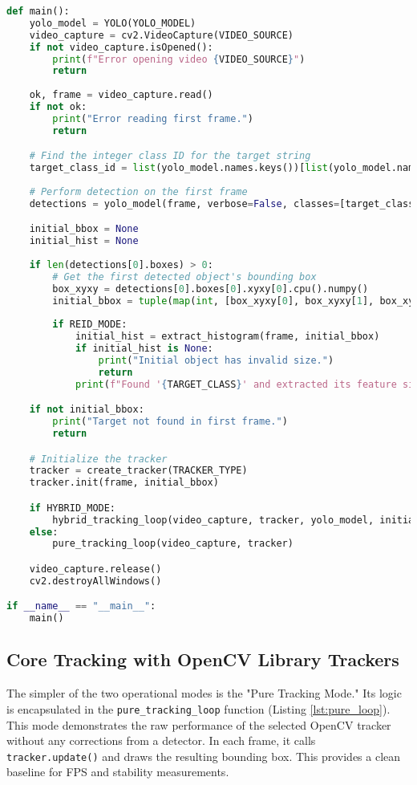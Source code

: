 \documentclass[12pt, a4paper]{article}
\begin{document}
\begin{lstlisting}[language=Python, caption={Main execution block for initialization and mode selection.}, label={lst:main_init}]
def main():
    yolo_model = YOLO(YOLO_MODEL)
    video_capture = cv2.VideoCapture(VIDEO_SOURCE)
    if not video_capture.isOpened():
        print(f"Error opening video {VIDEO_SOURCE}")
        return
        
    ok, frame = video_capture.read()
    if not ok:
        print("Error reading first frame.")
        return

    # Find the integer class ID for the target string
    target_class_id = list(yolo_model.names.keys())[list(yolo_model.names.values()).index(TARGET_CLASS.lower())]
    
    # Perform detection on the first frame
    detections = yolo_model(frame, verbose=False, classes=[target_class_id])

    initial_bbox = None
    initial_hist = None
    
    if len(detections[0].boxes) > 0:
        # Get the first detected object's bounding box
        box_xyxy = detections[0].boxes[0].xyxy[0].cpu().numpy()
        initial_bbox = tuple(map(int, [box_xyxy[0], box_xyxy[1], box_xyxy[2]-box_xyxy[0], box_xyxy[3]-box_xyxy[1]]))
        
        if REID_MODE:
            initial_hist = extract_histogram(frame, initial_bbox)
            if initial_hist is None:
                print("Initial object has invalid size.")
                return
            print(f"Found '{TARGET_CLASS}' and extracted its feature signature.")

    if not initial_bbox:
        print("Target not found in first frame.")
        return

    # Initialize the tracker
    tracker = create_tracker(TRACKER_TYPE)
    tracker.init(frame, initial_bbox)

    if HYBRID_MODE:
        hybrid_tracking_loop(video_capture, tracker, yolo_model, initial_bbox, initial_hist)
    else:
        pure_tracking_loop(video_capture, tracker)

    video_capture.release()
    cv2.destroyAllWindows()

if __name__ == "__main__":
    main()
\end{lstlisting}

\subsection{Core Tracking with OpenCV Library Trackers}
The simpler of the two operational modes is the "Pure Tracking Mode." Its logic is encapsulated in the \texttt{pure\_tracking\_loop} function (Listing \ref{lst:pure_loop}). This mode demonstrates the raw performance of the selected OpenCV tracker without any corrections from a detector. In each frame, it calls \texttt{tracker.update()} and draws the resulting bounding box. This provides a clean baseline for FPS and stability measurements.
\end{document}
